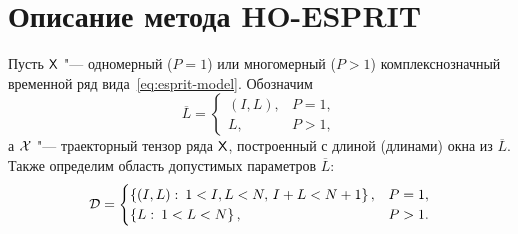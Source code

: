 \documentclass[specialist,
  substylefile=spbu_report.rtx,
subf,href,colorlinks=true, 12pt]{disser}
\theoremstyle{plain}
\theoremstyle{definition}
\theoremstyle{remark}
\begin{document}
\section{Описание метода HO-ESPRIT}\label{sec:Tensor-esprit-description}
Пусть $\mathsf{X}$ "--- одномерный ($P=1$) или многомерный ($P>1$)
комплекснозначный временной ряд
вида~\eqref{eq:esprit-model}.
Обозначим
\[
  \overline{L} =
  \begin{cases}
    (I, L), & P=1,\\
    L, & P>1,
  \end{cases}
\]
а $\mathcal{X}$ "--- траекторный тензор ряда $\mathsf{X}$, построенный с длиной
(длинами) окна из $\overline{L}$.
Также определим область допустимых параметров $\overline{L}$:
\[
  \mathcal{D} =
  \begin{cases}
    \left\{ (I, L):\: 1< I,L <N,\, I + L < N + 1 \right\}, & P = 1,\\
    \left\{ L:\: 1< L <N \right\}, & P > 1.
  \end{cases}
\]
\end{document}
